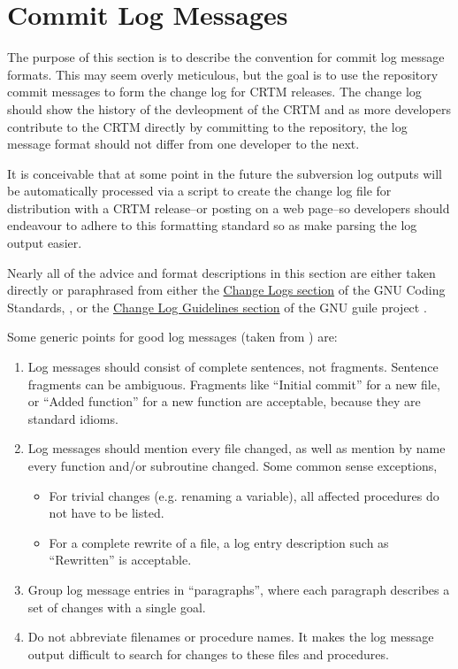 \chapter{Commit Log Messages}
The purpose of this section is to describe the convention for commit log message formats. This may seem overly meticulous, but the goal is to use the repository commit messages to form the change log for CRTM releases. The change log should show the history of the devleopment of the CRTM and as more developers contribute to the CRTM directly by committing to the repository, the log message format should not differ from one developer to the next.

It is conceivable that at some point in the future the subversion log outputs will be automatically processed via a script to create the change log file for distribution with a CRTM release--or posting on a web page--so developers should endeavour to adhere to this formatting standard so as make parsing the log output easier.

Nearly all of the advice and format descriptions in this section are either taken directly or paraphrased from either the \href{http://www.gnu.org/prep/standards/html_node/Change-Logs.html#Change-Logs}{Change Logs section} of the GNU Coding Standards, \citet{GNU_Coding_Standards}, or the \href{http://www.gnu.org/software/guile/changelogs/changelogs.html}{Change Log Guidelines section} of the GNU guile project \citet{guile_home}.

Some generic points for good log messages (taken from \citep{guile_home}) are:
\begin{enumerate}
  \item Log messages should consist of complete sentences, not fragments. Sentence fragments can be ambiguous. Fragments like ``Initial commit'' for a new file, or ``Added function'' for a new function are acceptable, because they are standard idioms.
  \item Log messages should mention every file changed, as well as mention by name every function and/or subroutine changed. Some common sense exceptions,
  \begin{itemize}
    \item For trivial changes (e.g. renaming a variable), all affected procedures do not have to be listed.
    \item For a complete rewrite of a file, a log entry description such as ``Rewritten'' is acceptable.
  \end{itemize}
  \item Group log message entries in ``paragraphs'', where each paragraph describes a set of changes with a single goal.
  \item Do not abbreviate filenames or procedure names. It makes the log message output difficult to search for changes to these files and procedures.
\end{enumerate}

